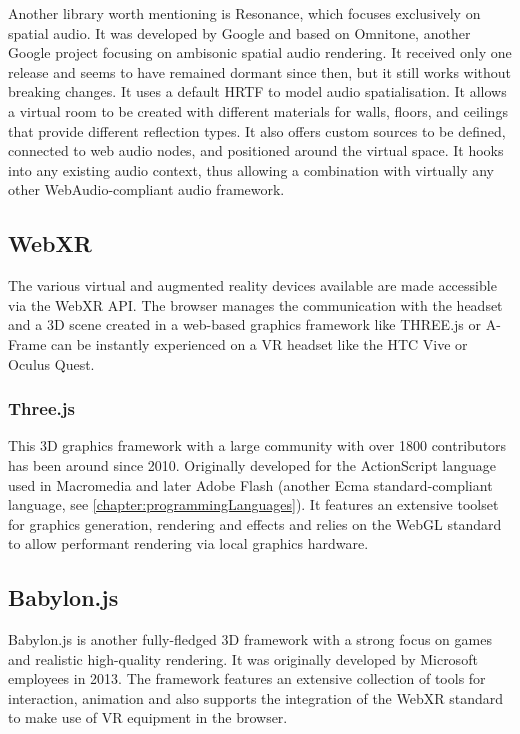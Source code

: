 Another library worth mentioning is Resonance, which focuses exclusively on spatial audio. It was developed by Google and based on Omnitone, another Google project focusing on ambisonic spatial audio rendering. It received only one release and seems to have remained dormant since then, but it still works without breaking changes. It uses a default \ac{HRTF} to model audio spatialisation. It allows a virtual room to be created with different materials for walls, floors, and ceilings that provide different reflection types. It also offers custom sources to be defined, connected to web audio nodes, and positioned around the virtual space. It hooks into any existing audio context, thus allowing a combination with virtually any other WebAudio-compliant audio framework.

\subsection{WebXR}

The various virtual and augmented reality devices available are made accessible via the WebXR \ac{API}. The browser manages the communication with the headset and a \ac{3D} scene created in a web-based graphics framework like THREE.js or A-Frame can be instantly experienced on a \ac{VR} headset like the HTC Vive or Oculus Quest.



\subsubsection{Three.js}

This \ac{3D} graphics framework with a large community with over 1800 contributors has been around since 2010. Originally developed for the ActionScript language used in Macromedia and later Adobe Flash (another Ecma standard-compliant language, see \autoref{chapter:programmingLanguages}). It features an extensive toolset for graphics generation, rendering and effects and relies on the WebGL standard to allow performant rendering via local graphics hardware.

\subsection{Babylon.js}

Babylon.js is another fully-fledged \ac{3D} framework with a strong focus on games and realistic high-quality rendering. It was originally developed by Microsoft employees in 2013. The framework features an extensive collection of tools for interaction, animation and also supports the integration of the \ac{WebXR} standard to make use of \ac{VR} equipment in the browser.

